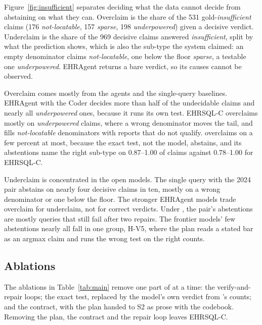 Figure~\ref{fig:insufficient} separates deciding what the data cannot decide
from abstaining on what they can. Overclaim is the share of the
531 gold-\emph{insufficient} claims (176 \emph{not-locatable}, 157
\emph{sparse}, 198 \emph{underpowered}) given a decisive verdict. Underclaim
is the share of the 969 decisive claims answered \emph{insufficient}, split by
what the prediction shows, which is also the sub-type the system claimed: an
empty denominator claims \emph{not-locatable}, one below the floor
\emph{sparse}, a testable one \emph{underpowered}. EHRAgent returns a bare
verdict, so its causes cannot be observed.

Overclaim comes mostly from the agents and the single-query baselines. EHRAgent
with the Coder decides more than half of the undecidable claims and nearly
all \emph{underpowered} ones, because it runs its own test. EHRSQL-C
overclaims mostly on \emph{underpowered} claims, where a wrong denominator
moves the tail, and fills \emph{not-locatable} denominators with reports
that do not qualify. \art{} overclaims on a few percent at most, because the
exact test, not the model, abstains, and its abstentions name the right
sub-type on 0.87--1.00 of claims against 0.78--1.00 for EHRSQL-C.

Underclaim is concentrated in the open models. The single query with the
2024 pair abstains on nearly four decisive claims in ten, mostly on a wrong
denominator or one below the floor. The stronger EHRAgent models trade
overclaim for underclaim, not for correct verdicts. Under \art{}, the pair's
abstentions are mostly queries that still fail after two repairs. The
frontier models' few abstentions nearly all fall in one group, H-V5, where the plan
reads a stated bar as an argmax claim and runs the wrong test on the right
counts.

\subsection{Ablations}
\label{sec:modular}

The ablations in Table~\ref{tab:main} remove one part of \art{} at a
time: the verify-and-repair loops; the exact test, replaced by the model's
own verdict from \art{}'s counts; and the contract, with the plan handed to
S2 as prose with the codebook. Removing the plan, the contract and the repair loop leaves
EHRSQL-C.


